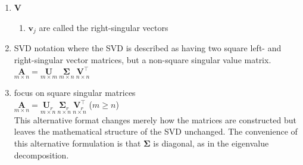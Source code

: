 \begin{enumerate}
    \item $\bm{V}$
    \begin{enumerate}
        \item $\bm{v}_j$ are called the right-singular vectors
        \hfill \cite{mfml/book/mml/Deisenroth-Faisal-Ong}

    \end{enumerate}


    \item \begin{definition}[Standard SVD/ Full SVD ($A = U\Sigma V^\top$)]
        SVD notation where the SVD is described as having two square left- and right-singular vector matrices, but a non-square singular value matrix.
        \hfill \cite{mfml/book/mml/Deisenroth-Faisal-Ong}
        \\
        $
            \underset{\displaystyle m\times n}{\bm{A}} =
            \underset{\displaystyle m\times m}{\bm{U}}\
            \underset{\displaystyle m\times n}{\bm{\Sigma}}\
            \underset{\displaystyle n\times n}{\bm{V}^\top}
        $
        \hfill \cite{mfml/book/mml/Deisenroth-Faisal-Ong}
    \end{definition}

    \item \begin{definition}[Reduced SVD ($A = U_r\Sigma_r V_r^\top$)]
         focus on square singular matrices
         \hfill \cite{mfml/book/mml/Deisenroth-Faisal-Ong}
         \\
         $
            \underset{\displaystyle m\times n}{\bm{A}} =
            \underset{\displaystyle m\times n}{\bm{U}_r}\
            \underset{\displaystyle n\times n}{\bm{\Sigma}_r}\
            \underset{\displaystyle n\times n}{\bm{V}_r^\top}
        $
        \hfill ($m \geq n$)
        \hfill \cite{mfml/book/mml/Deisenroth-Faisal-Ong}
        \\
        This alternative format changes merely how the matrices are constructed but leaves the mathematical structure of the SVD unchanged.
        The convenience of this alternative formulation is that $\bm{\Sigma}$ is diagonal, as in the eigenvalue decomposition.
        \hfill \cite{mfml/book/mml/Deisenroth-Faisal-Ong}
    \end{definition}


\end{enumerate}
